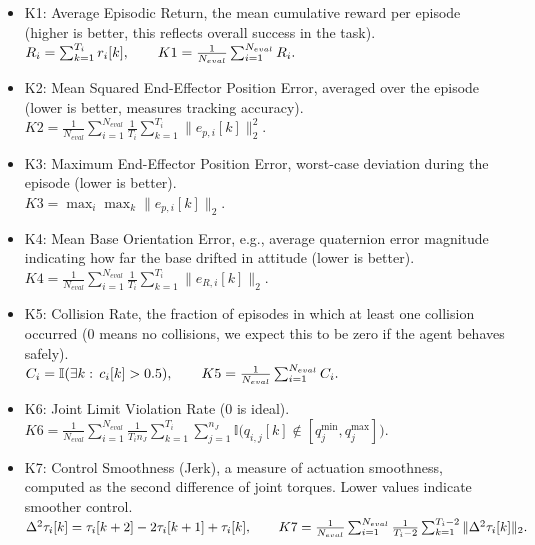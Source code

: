 \documentclass{ieeeaccess}
\begin{document}
\begin{itemize}
  \item K1: Average Episodic Return, the mean cumulative reward per episode (higher is better, this reflects overall success in the task).\\
  $R_i=\sum_{k=1}^{T_i} r_i[k], \\ \qquad K1=\frac{1}{N_{eval}}\sum_{i=1}^{N_{eval}} R_i.$

  \item K2: Mean Squared End-Effector Position Error, averaged over the episode (lower is better, measures tracking accuracy).\\
  $K2=\frac{1}{N_{eval}}\sum_{i=1}^{N_{eval}}\frac{1}{T_i}\sum_{k=1}^{T_i}\|e_{p,i}[k]\|_2^2.$

  \item K3: Maximum End-Effector Position Error, worst-case deviation during the episode (lower is better).\\
  $K3=\max_{i}\max_{k}\|e_{p,i}[k]\|_2.$

  \item K4: Mean Base Orientation Error, e.g., average quaternion error magnitude indicating how far the base drifted in attitude (lower is better).\\
  $K4=\frac{1}{N_{eval}}\sum_{i=1}^{N_{eval}}\frac{1}{T_i}\sum_{k=1}^{T_i}\|e_{R,i}[k]\|_2.$

  \item K5: Collision Rate, the fraction of episodes in which at least one collision occurred (0 means no collisions, we expect this to be zero if the agent behaves safely).\\
  $C_i=\mathbb{I}(\exists k:\,c_i[k]>0.5), \\ \qquad K5=\frac{1}{N_{eval}}\sum_{i=1}^{N_{eval}} C_i.$

  \item K6: Joint Limit Violation Rate (0 is ideal).\\
  $K6=\frac{1}{N_{eval}}\sum_{i=1}^{N_{eval}}\frac{1}{T_i n_J}\sum_{k=1}^{T_i}\sum_{j=1}^{n_J}
  \mathbb{I}\!\big(q_{i,j}[k]\notin[q_j^{\min},q_j^{\max}]\big).$

  \item K7: Control Smoothness (Jerk), a measure of actuation smoothness, computed as the second difference of joint torques. Lower values indicate smoother control.\\
  $\Delta^2\tau_i[k]=\tau_i[k+2]-2\tau_i[k+1]+\tau_i[k], \\\qquad
  K7=\frac{1}{N_{eval}}\sum_{i=1}^{N_{eval}}\frac{1}{T_i-2}\sum_{k=1}^{T_i-2}\|\Delta^2\tau_i[k]\|_2.$


\end{itemize}
\end{document}
